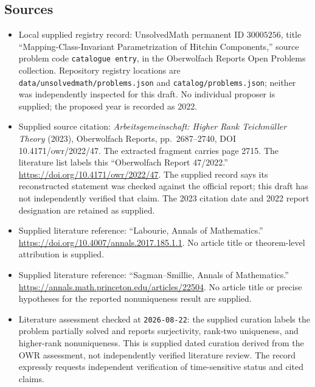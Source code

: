 \documentclass[11pt]{article}
\begin{document}
\subsection{Sources}
\begin{itemize}
\item Local supplied registry record: UnsolvedMath permanent ID \(30005256\), title ``Mapping-Class-Invariant Parametrization of Hitchin Components,'' source problem code \texttt{catalogue entry}, in the Oberwolfach Reports Open Problems collection. Repository registry locations are \texttt{data/unsolvedmath/problems.json} and \texttt{catalog/problems.json}; neither was independently inspected for this draft. No individual proposer is supplied; the proposed year is recorded as 2022.
\item Supplied source citation: \emph{Arbeitsgemeinschaft: Higher Rank Teichm\"uller Theory} (2023), Oberwolfach Reports, pp.~2687--2740, DOI 10.4171/owr/2022/47. The extracted fragment carries page 2715. The literature list labels this ``Oberwolfach Report 47/2022.'' \url{https://doi.org/10.4171/owr/2022/47}. The supplied record says its reconstructed statement was checked against the official report; this draft has not independently verified that claim. The 2023 citation date and 2022 report designation are retained as supplied.
\item Supplied literature reference: ``Labourie, Annals of Mathematics.'' \url{https://doi.org/10.4007/annals.2017.185.1.1}. No article title or theorem-level attribution is supplied.
\item Supplied literature reference: ``Sagman--Smillie, Annals of Mathematics.'' \url{https://annals.math.princeton.edu/articles/22504}. No article title or precise hypotheses for the reported nonuniqueness result are supplied.
\item Literature assessment checked at \texttt{2026-08-22}: the supplied curation labels the problem partially solved and reports surjectivity, rank-two uniqueness, and higher-rank nonuniqueness. This is supplied dated curation derived from the OWR assessment, not independently verified literature review. The record expressly requests independent verification of time-sensitive status and cited claims.
\end{itemize}
\end{document}
